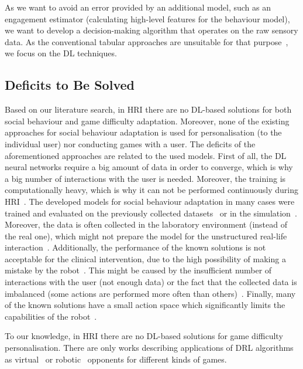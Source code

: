 \documentclass[thesis]{mas_proposal}
\begin{document}
As we want to avoid an error provided by an additional model, such as an engagement estimator (calculating high-level features for the behaviour model), we want to develop a decision-making algorithm that operates on the raw sensory data. As the conventional tabular approaches are unsuitable for that purpose~\cite{akalin2021reinforcement}, we focus on the DL techniques.

\subsection{Deficits to Be Solved}
Based on our literature search, in HRI there are no DL-based solutions for both social behaviour and game difficulty adaptation. Moreover, none of the existing approaches for social behaviour adaptation is used for personalisation (to the individual user) nor conducting games with a user. The deficits of the aforementioned approaches are related to the used models. First of all, the DL neural networks require a big amount of data in order to converge, which is why a big number of interactions with the user is needed. Moreover, the training is computationally heavy, which is why it can not be performed continuously during HRI~\cite{Qureshi2016,Qureshi2017,Qureshi2018,Romeo2019}. The developed models for social behaviour adaptation in many cases were trained and evaluated on the previously collected datasets~\cite{ClarkTurner2017,Romeo2018,Hijaz2021} or in the simulation~\cite{Turner2018,Belo2021,Belo2022}. Moreover, the data is often collected in the laboratory environment (instead of the real one), which might not prepare the model for the unstructured real-life interaction~\cite{ClarkTurner2017,Turner2018,Romeo2018}. Additionally, the performance of the known solutions is not acceptable for the clinical intervention, due to the high possibility of making a mistake by the robot~\cite{ClarkTurner2017,Turner2018,Romeo2019,Hijaz2021}. This might be caused by the insufficient number of interactions with the user (not enough data) or the fact that the collected data is imbalanced (some actions are performed more often than others)~\cite{Hijaz2021}. Finally, many of the known solutions have a small action space which significantly limits the capabilities of the robot~\cite{Qureshi2016,Qureshi2017,Qureshi2018,ClarkTurner2017,Turner2018,Belo2021,Belo2022,Romeo2018,Romeo2019,carpio2019learning}.

To our knowledge, in HRI there are no DL-based solutions for game difficulty personalisation. There are only works describing applications of DRL algorithms as virtual~\cite{mnih2015human,hausknecht2015deep,sorokin2015deep} or robotic~\cite{Cuayahuitl2017,Cuayahuitl2020} opponents for different kinds of games.
\end{document}
